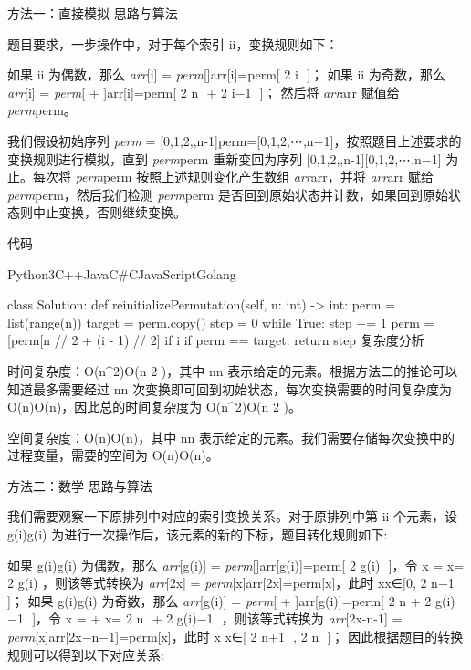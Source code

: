 方法一：直接模拟
思路与算法

题目要求，一步操作中，对于每个索引 ii，变换规则如下：

如果 ii 为偶数，那么 \textit{arr}[i] = \textit{perm}[]arr[i]=perm[ 
2
i
​
 ]；
如果 ii 为奇数，那么 \textit{arr}[i] = \textit{perm}[ + ]arr[i]=perm[ 
2
n
​
 + 
2
i−1
​
 ]；
然后将 \textit{arr}arr 赋值给 \textit{perm}perm。

我们假设初始序列 \textit{perm} = [0,1,2,\cdots,n-1]perm=[0,1,2,⋯,n−1]，按照题目上述要求的变换规则进行模拟，直到 \textit{perm}perm 重新变回为序列 [0,1,2,\cdots,n-1][0,1,2,⋯,n−1] 为止。每次将 \textit{perm}perm 按照上述规则变化产生数组 \textit{arr}arr，并将 \textit{arr}arr 赋给 \textit{perm}perm，然后我们检测 \textit{perm}perm 是否回到原始状态并计数，如果回到原始状态则中止变换，否则继续变换。

代码

Python3C++JavaC#CJavaScriptGolang

class Solution:
    def reinitializePermutation(self, n: int) -> int:
        perm = list(range(n))
        target = perm.copy()
        step = 0
        while True:
            step += 1
            perm = [perm[n // 2 + (i - 1) // 2] if i %
            if perm == target:
                return step
复杂度分析

时间复杂度：O(n^2)O(n 
2
 )，其中 nn 表示给定的元素。根据方法二的推论可以知道最多需要经过 nn 次变换即可回到初始状态，每次变换需要的时间复杂度为 O(n)O(n)，因此总的时间复杂度为 O(n^2)O(n 
2
 )。

空间复杂度：O(n)O(n)，其中 nn 表示给定的元素。我们需要存储每次变换中的过程变量，需要的空间为 O(n)O(n)。

方法二：数学
思路与算法

我们需要观察一下原排列中对应的索引变换关系。对于原排列中第 ii 个元素，设 g(i)g(i) 为进行一次操作后，该元素的新的下标，题目转化规则如下:

如果 g(i)g(i) 为偶数，那么 \textit{arr}[g(i)] = \textit{perm}[]arr[g(i)]=perm[ 
2
g(i)
​
 ]，令 x = x= 
2
g(i)
​
 ，则该等式转换为 \textit{arr}[2x] = \textit{perm}[x]arr[2x]=perm[x]，此时 x\in[0,\dfrac{n-1}{2}]x∈[0, 
2
n−1
​
 ]；
如果 g(i)g(i) 为奇数，那么 \textit{arr}[g(i)] = \textit{perm}[ + ]arr[g(i)]=perm[ 
2
n
​
 + 
2
g(i)−1
​
 ]，令 x =  + x= 
2
n
​
 + 
2
g(i)−1
​
 ，则该等式转换为 \textit{arr}[2x-n-1] = \textit{perm}[x]arr[2x−n−1]=perm[x]，此时 x x∈[ 
2
n+1
​
 , 
2
n
​
 ]；
因此根据题目的转换规则可以得到以下对应关系:

